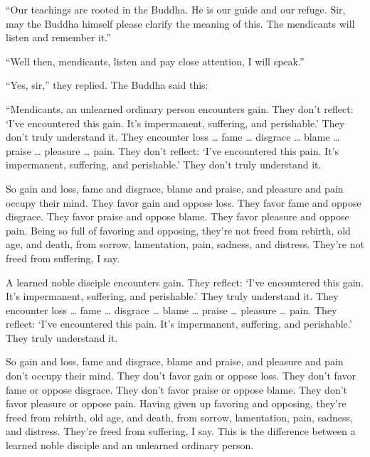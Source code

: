 \documentclass[12pt,openany]{book}%
\begin{document}
“Our teachings are rooted in the Buddha. He is our guide and our refuge. Sir, may the Buddha himself please clarify the meaning of this. The mendicants will listen and remember it.” 

“Well then, mendicants, listen and pay close attention, I will speak.” 

“Yes, sir,” they replied. The Buddha said this: 

“Mendicants, an unlearned ordinary person encounters gain. They don’t reflect: ‘I’ve encountered this gain. It’s impermanent, suffering, and perishable.’ They don’t truly understand it. They encounter loss … fame … disgrace … blame … praise … pleasure … pain. They don’t reflect: ‘I’ve encountered this pain. It’s impermanent, suffering, and perishable.’ They don’t truly understand it. 

So gain and loss, fame and disgrace, blame and praise, and pleasure and pain occupy their mind. They favor gain and oppose loss. They favor fame and oppose disgrace. They favor praise and oppose blame. They favor pleasure and oppose pain. Being so full of favoring and opposing, they’re not freed from rebirth, old age, and death, from sorrow, lamentation, pain, sadness, and distress. They’re not freed from suffering, I say. 

A learned noble disciple encounters gain. They reflect: ‘I’ve encountered this gain. It’s impermanent, suffering, and perishable.’ They truly understand it. They encounter loss … fame … disgrace … blame … praise … pleasure … pain. They reflect: ‘I’ve encountered this pain. It’s impermanent, suffering, and perishable.’ They truly understand it. 

So gain and loss, fame and disgrace, blame and praise, and pleasure and pain don’t occupy their mind. They don’t favor gain or oppose loss. They don’t favor fame or oppose disgrace. They don’t favor praise or oppose blame. They don’t favor pleasure or oppose pain. Having given up favoring and opposing, they’re freed from rebirth, old age, and death, from sorrow, lamentation, pain, sadness, and distress. They’re freed from suffering, I say. This is the difference between a learned noble disciple and an unlearned ordinary person. 
\end{document}
